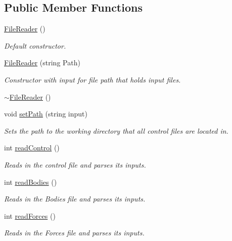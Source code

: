 \subsection*{Public Member Functions}
\begin{DoxyCompactItemize}
\item 
\hypertarget{class_file_reader_a615dcb2443cad1f2ca123c7c0c334480}{\hyperlink{class_file_reader_a615dcb2443cad1f2ca123c7c0c334480}{File\-Reader} ()}\label{class_file_reader_a615dcb2443cad1f2ca123c7c0c334480}

\begin{DoxyCompactList}\small\item\em Default constructor. \end{DoxyCompactList}\item 
\hyperlink{class_file_reader_a3e5fd243a8d70627d414eea39f8a7543}{File\-Reader} (string Path)
\begin{DoxyCompactList}\small\item\em Constructor with input for file path that holds input files. \end{DoxyCompactList}\item 
\hyperlink{class_file_reader_a1382969e8f1468f3b04ad4b44ab39dee}{$\sim$\-File\-Reader} ()
\item 
void \hyperlink{class_file_reader_a14f05351af5426de8c30dfcfc79c92d1}{set\-Path} (string input)
\begin{DoxyCompactList}\small\item\em Sets the path to the working directory that all control files are located in. \end{DoxyCompactList}\item 
int \hyperlink{class_file_reader_a967cab6ec0822fd8bcf392873a8a82b1}{read\-Control} ()
\begin{DoxyCompactList}\small\item\em Reads in the control file and parses its inputs. \end{DoxyCompactList}\item 
int \hyperlink{class_file_reader_a44770836db4ab430139118727ace6547}{read\-Bodies} ()
\begin{DoxyCompactList}\small\item\em Reads in the Bodies file and parses its inputs. \end{DoxyCompactList}\item 
int \hyperlink{class_file_reader_ab78d2f631eb8e64b0a68d25eeca80be5}{read\-Forces} ()
\begin{DoxyCompactList}\small\item\em Reads in the Forces file and parses its inputs. \end{DoxyCompactList}\item 

\end{DoxyCompactItemize}
